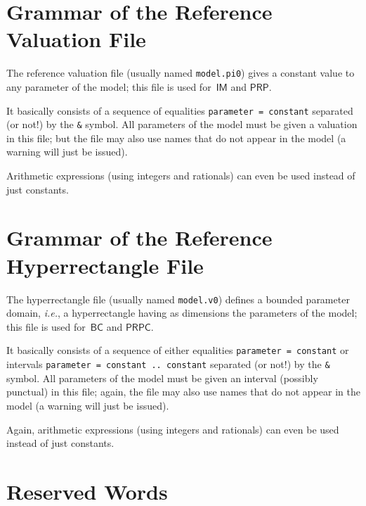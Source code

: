 \documentclass[a4paper,11pt]{report}
\newcommand{\BC}{\ensuremath{\mathsf{BC}}}
\newcommand{\IM}{\ensuremath{\mathsf{IM}}}
\newcommand{\PRP}{\ensuremath{\mathsf{PRP}}}
\newcommand{\PRPC}{\ensuremath{\mathsf{PRPC}}}
\newcommand{\styleIMI}[1]{\textcolor{imicolor}{\texttt{#1}}}
\newcommand{\stylePath}[1]{\textcolor{pathcolor}{\texttt{#1}}}
\newcommand{\ie}{\textcolor{colorok}{\textit{i.e.}, }}
\begin{document}
\section{Grammar of the Reference Valuation File}

The reference valuation file (usually named \stylePath{model.pi0}) gives a constant value to any parameter of the model;
this file is used for~\IM{} and \PRP{}.

It basically consists of a sequence of equalities \styleIMI{parameter = constant} separated (or not!) by the \styleIMI{\&} symbol.
All parameters of the model must be given a valuation in this file; but the file may also use names that do not appear in the model (a warning will just be issued).

Arithmetic expressions (using integers and rationals) can even be used instead of just constants.



\section{Grammar of the Reference Hyperrectangle File}

The hyperrectangle file (usually named \stylePath{model.v0}) defines a bounded parameter domain, \ie{} a hyperrectangle having as dimensions the parameters of the model;
this file is used for~\BC{} and \PRPC{}.

It basically consists of a sequence of either equalities \styleIMI{parameter = constant} or intervals \styleIMI{parameter = constant .. constant} separated (or not!) by the \styleIMI{\&} symbol.
All parameters of the model must be given an interval (possibly punctual) in this file; again, the file may also use names that do not appear in the model (a warning will just be issued).

Again, arithmetic expressions (using integers and rationals) can even be used instead of just constants.



\section{Reserved Words}
\end{document}
